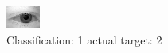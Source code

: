 \begin{figure}[h!]
\begin{center}
\includegraphics[width=0.60\columnwidth]{figures/ID342_class_1_target_2.png}
\end{center}
\caption{ Classification: 1 actual target: 2}
\label{fig:ID342_class_1_target_2}
\end{figure}
